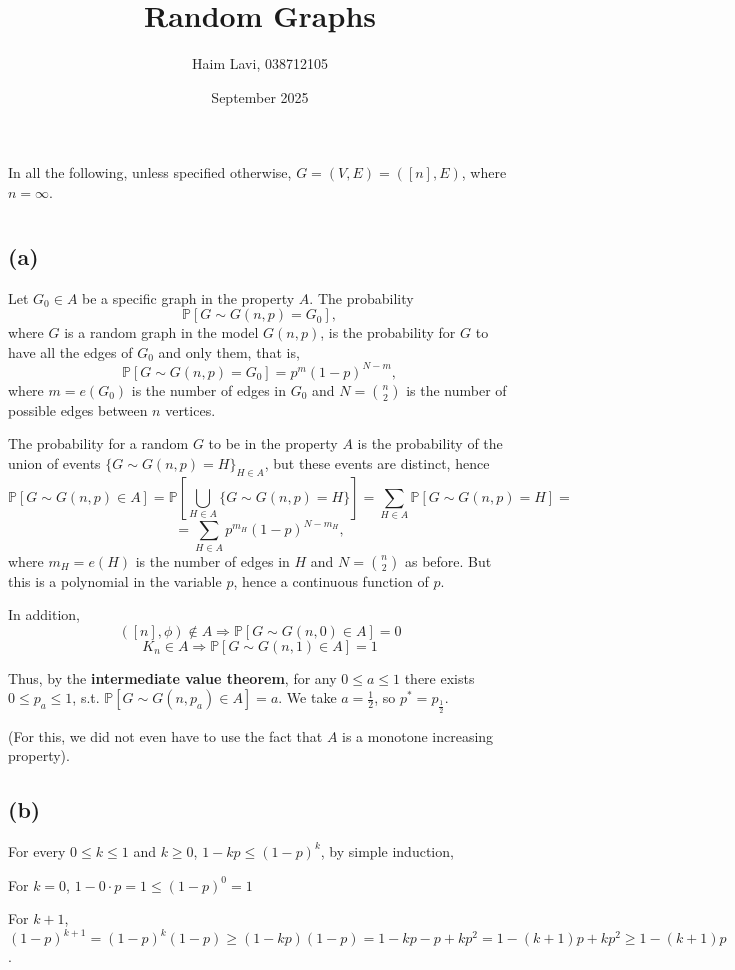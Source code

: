 \documentclass{article}
\title{Random Graphs}
\author{Haim Lavi, 038712105}
\date{September 2025}
\begin{document}
\maketitle

In all the following, unless specified otherwise, $G=(V,E)=([n],E)$, where $n=\infty$.
\section{}
\subsection*{(a)}
Let $G_0\in{A}$ be a specific graph in the property $A$. The probability \[\mathbb{P}[G\sim{G(n,p)}=G_0],\]
where $G$ is a random graph in the model $G(n,p)$, is the probability for $G$ to have all the edges of $G_0$ and only them, that is,
\[\mathbb{P}[G\sim{G(n,p)}=G_0]=p^m(1-p)^{N-m},\]
where $m=e(G_0)$ is the number of edges in $G_0$ and $N=\binom{n}{2}$ is the number of possible edges between $n$ vertices.

The probability for a random $G$ to be in the property $A$ is the probability of the union of events $\{G\sim{G(n,p)}=H\}_{H\in{A}}$, but these events are distinct, hence \[\mathbb{P}[G\sim{G(n,p)}\in{A}]=\mathbb{P}[\bigcup_{H\in{A}}\{G\sim{G(n,p)}=H\}]=\sum_{H\in{A}}\mathbb{P}[G\sim{G(n,p)}=H]=\]\[=\sum_{H\in{A}}p^{m_H}(1-p)^{N-m_H},\]
where $m_H=e(H)$ is the number of edges in $H$ and $N=\binom{n}{2}$ as before. But this is a polynomial in the variable $p$, hence a continuous function of $p$. 

In addition,
\[([n],\phi)\notin{A}\Rightarrow\mathbb{P}[G\sim{G(n,0)}\in{A}]=0\]\[K_n\in{A}\Rightarrow\mathbb{P}[G\sim{G(n,1)}\in{A}]=1\]

Thus, by the \textbf{intermediate value theorem}, for any $0\leq{a}\leq{1}$ there exists $0\leq{p_a}\leq{1}$, s.t. $\mathbb{P}[G\sim{G(n,p_a)}\in{A}]=a$. We take $a=\frac{1}{2}$, so $p^\ast=p_\frac{1}{2}$.

(For this, we did not even have to use the fact that $A$ is a monotone increasing property).
\subsection*{(b)}
For every $0\leq{k}\leq{1}$ and $k\geq{0}$, $1-kp\leq(1-p)^k$, by simple induction,

For $k=0$, $1-0\cdot{p}=1\leq{(1-p)^0}=1$

For $k+1$, $(1-p)^{k+1}=(1-p)^k(1-p)\geq(1-kp)(1-p)=1-kp-p+kp^2=1-(k+1)p+kp^2\geq{1-(k+1)p}$.
\end{document}
